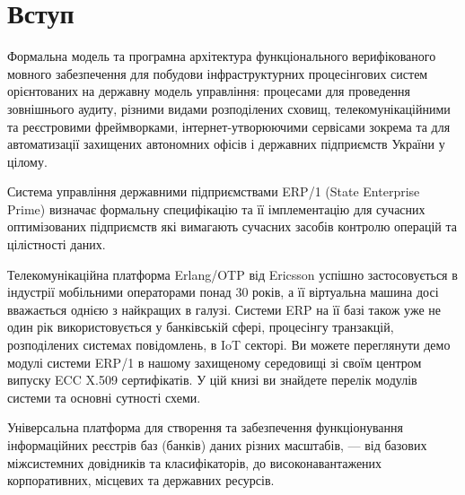 \chapter{Вступ}

Формальна модель та програмна архітектура
функціонального верифікованого мовного забезпечення
для побудови інфраструктурних процесінгових систем
орієнтованих на державну модель управління:
процесами для проведення зовнішнього аудиту,
різними видами розподілених сховищ,
телекомунікаційними та реєстровими фреймворками,
інтернет-утворюючими сервісами зокрема та для
автоматизації захищених автономних офісів і
державних підприємств України у цілому.

Система управління державними підприємствами ERP/1 (State Enterprise Prime) визначає формальну
специфікацію та її імплементацію для сучасних оптимізованих підприємств
які вимагають сучасних засобів контролю операцій та цілістності даних.

Телекомунікаційна платформа Erlang/OTP від Ericsson успішно застосовується
в індустрії мобільними операторами понад 30 років, а її віртуальна машина
досі вважається однією з найкращих в галузі. Системи ERP на її базі також
уже не один рік використовується у банківській сфері, процесінгу транзакцій,
розподілених системах повідомлень, в IoT секторі. Ви можете переглянути демо
модулі системи ERP/1 в нашому захищеному середовищі зі своїм центром
випуску ECC X.509 сертифікатів. У цій книзі ви знайдете перелік модулів
системи та основні сутності схеми.

Універсальна платформа для створення та забезпечення функціонування
інформаційних реєстрів баз (банків) даних різних масштабів, — від базових
міжсистемних довідників та класифікаторів, до високонавантажених корпоративних,
місцевих та державних ресурсів.
